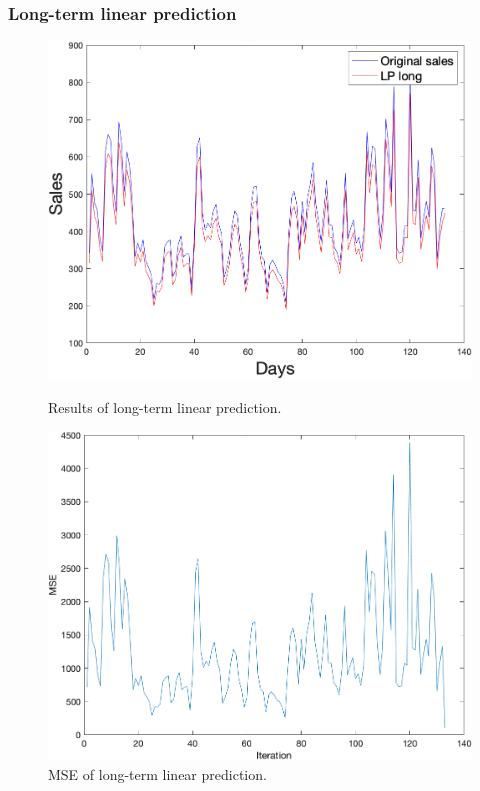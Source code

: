         \subsubsection{Long-term linear prediction} \label{subsec:res_ltlp}
        \begin{figure}[h]
            \centering
            \begin{minipage}{0.45\textwidth}
                \centering
                \includegraphics[width=1\textwidth]{figures/expLTLP.png}
                \caption{Results of long-term linear prediction.}
                \label{fig:ltlp}
            \end{minipage}\hfill
            \begin{minipage}{0.45\textwidth}
                \centering
                \includegraphics[width=1\textwidth]{figures/expMseLTLP.png}
                \caption{MSE of long-term linear prediction.}
                \label{fig:ltlpmse}
            \end{minipage}
        \end{figure}
        \newpage
